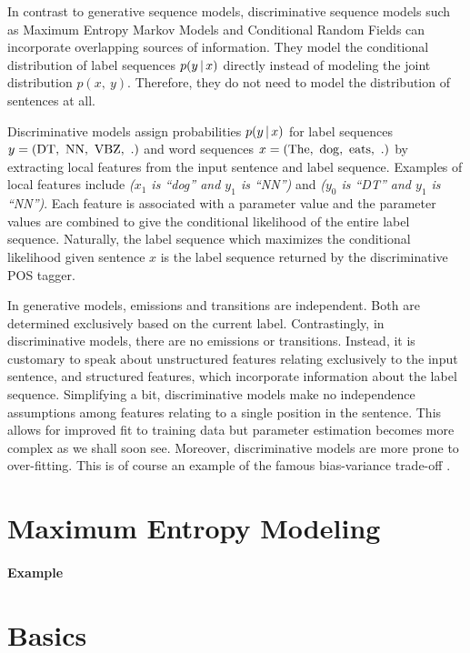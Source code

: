 In contrast to generative sequence models, discriminative sequence
models such as Maximum Entropy Markov Models \citep{Ratnaparkhi1998}
and Conditional Random Fields \citep{Lafferty2001} can incorporate
overlapping sources of information. They model the conditional
distribution of label sequences $p(y\mbox{$ \, | \, $} x)$ directly instead of
modeling the joint distribution $p(x,\ y)$. Therefore, they do not
need to model the distribution of sentences at all. 

Discriminative models assign probabilities $p(y\mbox{$ \, | \, $} x)$ for label
sequences $y = ({\rm DT},\ {\rm NN},\ {\rm VBZ},\ {\rm .})$ and word sequences $x = ({\rm The},\ {\rm dog},\ {\rm eats},\ {\rm .})$ by extracting local features from
the input sentence and label sequence. Examples of local features
include {\it ($x_1$ is ``dog'' and $y_1$ is ``NN'')} and {\it ($y_{0}$ is ``DT'' and
  $y_1$ is ``NN'')}. Each feature is associated with a parameter value and the
parameter values are combined to give the conditional likelihood of
the entire label sequence. Naturally, the label sequence which
maximizes the conditional likelihood given sentence $x$ is the label
sequence returned by the discriminative POS tagger.

In generative models, emissions and transitions are independent. Both
are determined exclusively based on the current label. Contrastingly,
in discriminative models, there are no emissions or
transitions. Instead, it is customary to speak about unstructured
features relating exclusively to the input sentence, and structured
features, which incorporate information about the label
sequence. Simplifying a bit, discriminative models make no
independence assumptions among features relating to a single position
in the sentence. This allows for improved fit to training data but
parameter estimation becomes more complex as we shall soon
see. Moreover, discriminative models are more prone to
over-fitting. This is of course an example of the famous bias-variance
trade-off \citep{Geman1992}.


\section{Maximum Entropy Modeling}
\label{sec:me}

\paragraph{Example}
\label{sec:maxent-ex}

\section{Basics}
\label{crf:basics}

